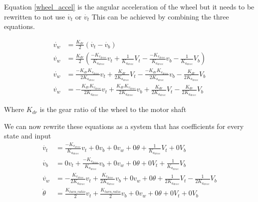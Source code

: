 \documentclass{scrartcl}
\begin{document}
Equation \ref{wheel_accel} is the angular acceleration of the wheel but it needs to be rewritten to not use \(\dot{v_t}\) or \(\dot{v_t}\) This can be achieved by combining the three equations.

\begin{align}
    \dot{v_w} & = \frac{K_\mathit{dr}}{2}(\dot{v_t} - \dot{v_b})                                                                                                                                                                                              \\
    \dot{v_w} & = \frac{K_\mathit{dr}}{2}(\frac{-K_{v_\mathit{drive}}}{K_{a_\mathit{drive}}}v_t + \frac{1}{K_{a_\mathit{drive}}}V_t - \frac{-K_{v_\mathit{drive}}}{K_{a_\mathit{drive}}}v_b - \frac{1}{K_{a_\mathit{drive}}}V_b)                              \\
    \dot{v_w} & = \frac{-K_\mathit{dr}K_{v_\mathit{drive}}}{2K_{a_\mathit{drive}}}v_t + \frac{K_\mathit{dr}}{2K_{a_\mathit{drive}}}V_t - \frac{-K_\mathit{dr}K_{v_\mathit{drive}}}{2K_{a_\mathit{drive}}}v_b - \frac{K_\mathit{dr}}{2K_{a_\mathit{drive}}}V_b \\
    \dot{v_w} & = -\frac{K_\mathit{dr}K_{v_\mathit{drive}}}{2K_{a_\mathit{drive}}}v_t + \frac{K_\mathit{dr}K_{v_\mathit{drive}}}{2K_{a_\mathit{drive}}}v_b + \frac{K_\mathit{dr}}{2K_{a_\mathit{drive}}}V_t - \frac{K_\mathit{dr}}{2K_{a_\mathit{drive}}}V_b
\end{align}

Where \(K_\mathit{dr}\) is the gear ratio of the wheel to the motor shaft

We can now rewrite these equations as a system that has coefficients for every state and input
\begin{align}
    \dot{v_t}    & = \frac{-K_{v_\mathit{drive}}}{K_{a_\mathit{drive}}}v_t + 0v_b + 0v_w + 0\theta + \frac{1}{K_{a_\mathit{drive}}}V_t + 0V_b                                                                                  \\
    \dot{v_b}    & = 0v_t + \frac{-K_{v_\mathit{drive}}}{K_{a_\mathit{drive}}}v_b + 0v_w + 0\theta + 0V_t + \frac{1}{K_{a_\mathit{drive}}}V_b                                                                                  \\
    \dot{v_w}    & = -\frac{K_{v_\mathit{drive}}}{2K_{a_\mathit{drive}}}v_t + \frac{K_{v_\mathit{drive}}}{2K_{a_\mathit{drive}}}v_b + 0v_w + 0\theta + \frac{1}{2K_{a_\mathit{drive}}}V_t - \frac{1}{2K_{a_\mathit{drive}}}V_b \\
    \dot{\theta} & = \frac{K_\mathit{turn\_ratio}}{2}v_t + \frac{K_\mathit{turn\_ratio}}{2}v_b + 0v_w + 0\theta + 0V_t + 0V_b
\end{align}
\end{document}
